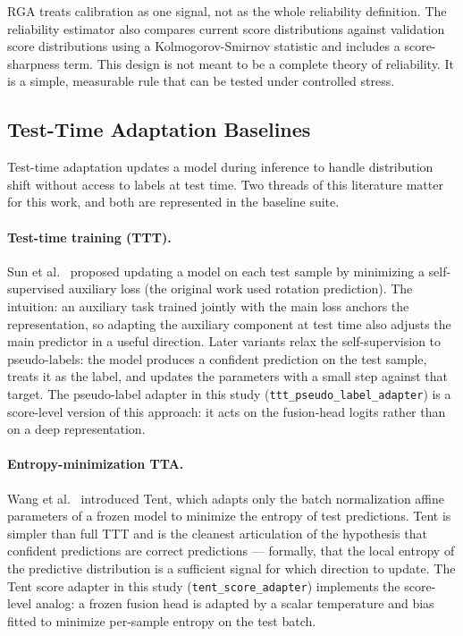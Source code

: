 \documentclass[11pt]{article}
\newcommand{\method}{RGA}
\begin{document}
\method{} treats calibration as one signal, not as the whole reliability
definition. The reliability estimator also compares current score distributions
against validation score distributions using a Kolmogorov-Smirnov statistic and
includes a score-sharpness term. This design is not meant to be a complete
theory of reliability. It is a simple, measurable rule that can be tested under
controlled stress.

\subsection{Test-Time Adaptation Baselines}

Test-time adaptation updates a model during inference to handle distribution
shift without access to labels at test time. Two threads of this literature
matter for this work, and both are represented in the baseline suite.

\paragraph{Test-time training (TTT).} Sun et al.~\cite{sun2020testtime}
proposed updating a model on each test sample by minimizing a
self-supervised auxiliary loss (the original work used rotation
prediction). The intuition: an auxiliary task trained jointly with
the main loss anchors the representation, so adapting the auxiliary
component at test time also adjusts the main predictor in a useful
direction. Later variants relax the self-supervision to pseudo-labels:
the model produces a confident prediction on the test sample, treats it
as the label, and updates the parameters with a small step against that
target. The pseudo-label adapter in this study (\texttt{ttt\_pseudo\_label\_adapter})
is a score-level version of this approach: it acts on the fusion-head
logits rather than on a deep representation.

\paragraph{Entropy-minimization TTA.} Wang et al.~\cite{wang2021tent}
introduced Tent, which adapts only the batch normalization affine
parameters of a frozen model to minimize the entropy of test predictions.
Tent is simpler than full TTT and is the cleanest articulation of the
hypothesis that confident predictions are correct predictions ---
formally, that the local entropy of the predictive distribution is a
sufficient signal for which direction to update. The Tent score adapter
in this study (\texttt{tent\_score\_adapter}) implements the score-level
analog: a frozen fusion head is adapted by a scalar temperature and bias
fitted to minimize per-sample entropy on the test batch.
\end{document}
